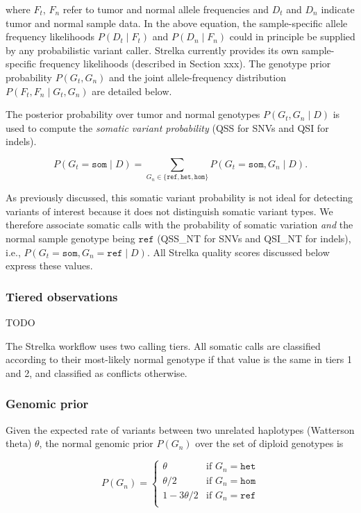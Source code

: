 \documentclass{article}
\begin{document}
\noindent where $F_t$, $F_n$ refer to tumor and normal allele frequencies and $D_t$ and $D_n$ indicate tumor and normal sample data. In the above equation, the sample-specific allele frequency likelihoods $P(D_t \mid F_t)$ and $P(D_n \mid F_n)$ could in principle be supplied by any probabilistic variant caller. Strelka currently provides its own sample-specific frequency likelihoods (described in Section xxx). The genotype prior probability $P(G_t, G_n)$ and the joint allele-frequency distribution $P(F_t,F_n \mid G_t,G_n)$ are detailed below.

The posterior probability over tumor and normal genotypes $P(G_t,G_n \mid D)$ is used to compute the {\em somatic variant probability} (QSS for SNVs and QSI for indels).

\begin{equation}
\label{eqn:somVarProb}
	P(G_t = \texttt{som} \mid D) = \sum_{G_n \in \{ \texttt{ref}, \texttt{het}, \texttt{hom} \}}{P(G_t=\texttt{som},G_n \mid D)}.
\end{equation}

As previously discussed, this somatic variant probability is not ideal for detecting variants of interest because it does not distinguish somatic variant types. We therefore associate somatic calls with the probability of somatic variation {\em and} the normal sample genotype being $\texttt{ref}$ (QSS\_NT for SNVs and QSI\_NT for indels), i.e., $P(G_t = \texttt{som}, G_n = \texttt{ref} \mid D)$. All Strelka quality scores discussed below express these values.


\subsubsection{Tiered observations}
\label{sec:somatic_tiers}

TODO

The Strelka workflow uses two calling tiers. All somatic calls are classified according to their most-likely normal genotype if that value is the same in tiers 1 and 2, and classified as conflicts otherwise.

\subsubsection{Genomic prior}
Given the expected rate of variants between two unrelated haplotypes (Watterson theta) $\theta$, the normal genomic prior $P(G_n)$ over the set of diploid genotypes is

\begin{equation*}
P(G_n)=
\begin{cases}
	\theta & \text{if } G_n = \texttt{het} \\
	\theta/2 & \text{if } G_n = \texttt{hom} \\
	1 - 3\theta/2 & \text{if } G_n = \texttt{ref} \\
\end{cases}
\end{equation*}
\end{document}
